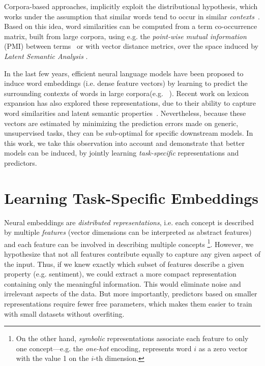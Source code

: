 \documentclass[letterpaper]{article}
\begin{document}
Corpora-based approaches, implicitly exploit the distributional hypothesis, which works under the assumption that similar words tend to occur in similar \textit{contexts}~\cite{harris1954distributional}. Based on this idea, word similarities can be computed from a term co-occurrence matrix, built from large corpora, using e.g. the \textit{point-wise mutual information} (PMI) between terms~\cite{Turney03Measuring,kiritchenko2014sentiment} or with vector distance metrics, over the space induced by \textit{Latent Semantic Analysis} \cite{Bestgen12Checking,Yu:2013:UCE:2438098.2438152}. 

In the last few years, efficient neural language models have been proposed to induce word embeddings (i.e. dense feature vectors) by learning to predict the surrounding contexts of words in large corpora(e.g. ~\cite{pennington2014glove}). Recent work on lexicon expansion has also explored these representations, due to their ability to capture word similarities and latent semantic properties~\cite{tang-EtAl2014,Amir,rothe2016ultradense}. Nevertheless, because these vectors are estimated by minimizing the prediction errors made on generic, unsupervised tasks, they can be sub-optimal for specific downstream models. In this work, we take this observation into account and demonstrate that better models can be induced, by jointly learning \textit{task-specific} representations and predictors.

\section{Learning Task-Specific Embeddings}

Neural embeddings are \textit{distributed representations}, i.e. each concept is described by multiple \textit{features} (vector dimensions can be interpreted as abstract features) and each feature can be involved in describing multiple concepts \cite{hinton1986learning}\footnote{On the other hand, \textit{symbolic} representations associate each feature to only one concept---e.g. the \textit{one-hot} encoding, represents word $i$ as a zero vector with the value 1 on the $i$-th dimension.}. However, we hypothesize that not all features contribute equally to capture any given aspect of the input. Thus, if we knew exactly which subset of features describe a given property (e.g. sentiment), we could extract a more compact representation containing only the meaningful information. This would eliminate noise and irrelevant aspects of the data. But more importantly, predictors based on smaller representations require fewer free parameters, which makes them easier to train with small datasets without overfiting.
\end{document}
